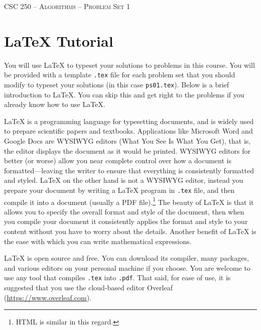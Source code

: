 \documentclass[11pt]{article}
\theoremstyle{nonumberplain}
\begin{document}



\begin{center}

{\LARGE
\textsc{CSC 250 -- Algorithms -- Problem Set 1}
\bigskip}

\bigskip
{\Large
}


\end{center}


\section*{\LaTeX{} Tutorial}

You will use \LaTeX{} to typeset your solutions to problems in this
course.  You will be provided with a template \texttt{.tex} file for
each problem set that you should modify to typeset your solutions (in
this case \texttt{ps01.tex}).  Below is a brief introduction to
\LaTeX{}.  You can skip this and get right to the problems if you
already know how to use \LaTeX{}.

\LaTeX{} is a programming language for typesetting documents, and is
widely used to prepare scientific papers and textbooks.  Applications
like Microsoft Word and Google Docs are WYSIWYG editors (What You See
Is What You Get), that is, the editor displays the document as it
would be printed.  WYSIWYG editors for better (or worse) allow you
near complete control over how a document is formatted---leaving the
writer to ensure that everything is consistently formatted and
styled. \LaTeX{} on the other hand is not a WYSIWYG editor, instead
you prepare your document by writing a \LaTeX{} program in
\texttt{.tex} file, and then compile it into a document (usually a PDF
file).\footnote{HTML is similar in this regard.}  The beauty of
\LaTeX{} is that it allows you to specify the overall format and style
of the document, then when you compile your document it consistently
applies the format and style to your content without you have to worry
about the details.  Another benefit of \LaTeX{} is the ease with which
you can write mathematical expressions.

\LaTeX{} is open source and free.  You can download its compiler, many
packages, and various editors on your personal machine if you choose.  
You are welcome to use any tool that compiles \texttt{.tex} into
\texttt{.pdf}.  That said, for ease of use, it is suggested that you
use the cloud-based editor Overleaf (\url{https://www.overleaf.com}).
\end{document}
